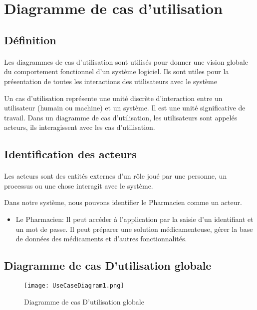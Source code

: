 \documentclass[12pt, openany]{report}
\begin{document}
\section{Diagramme de cas d'utilisation}
\subsection{Définition}
\paragraph{}Les diagrammes de cas d’utilisation sont utilisés pour donner une vision globale du comportement fonctionnel d’un système logiciel. Ils sont utiles pour la présentation de toutes les interactions des utilisateurs avec le
système

Un cas d'utilisation représente une unité discrète d'interaction entre un utilisateur (humain ou machine) et un système. Il est une unité significative de travail. Dans un diagramme de cas d'utilisation, les utilisateurs sont appelés acteurs, ils interagissent avec les cas d'utilisation.

\subsection{Identification des acteurs}
\paragraph{}Les acteurs sont des entités externes d’un rôle joué par une personne, un processus ou une chose interagit avec le système.

Dans notre système, nous pouvons identifier le Pharmacien comme un acteur.
\vspace{5mm}
\begin{itemize} \renewcommand {\labelitemi }{$\bullet $}
	\item Le Pharmacien: Il peut accéder à l’application par la saisie d’un identifiant et un mot de passe. Il peut préparer une solution médicamenteuse, gérer la base de données des médicaments et d'autres fonctionnalités.
\end{itemize}
\newpage
\subsection{Diagramme de cas D'utilisation globale}
\begin{figure}[! h]
	\centering
	\hspace{-20mm}
	\texttt{[image: UseCaseDiagram1.png]}\\ %
	\caption{Diagramme de cas D'utilisation globale}
\end{figure}
\end{document}
